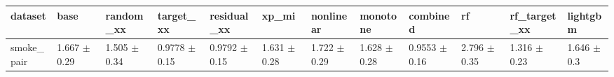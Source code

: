 \begin{tabular}{llllllllllll}
\toprule
dataset & base & random\_xx & target\_xx & residual\_xx & xp\_mi & nonlinear & monotone & combined & rf & rf\_target\_xx & lightgbm \\
\midrule
smoke\_pair & 1.667 $\pm$ 0.29 & 1.505 $\pm$ 0.34 & 0.9778 $\pm$ 0.15 & 0.9792 $\pm$ 0.15 & 1.631 $\pm$ 0.28 & 1.722 $\pm$ 0.29 & 1.628 $\pm$ 0.28 & 0.9553 $\pm$ 0.16 & 2.796 $\pm$ 0.35 & 1.316 $\pm$ 0.23 & 1.646 $\pm$ 0.3 \\
\bottomrule
\end{tabular}

